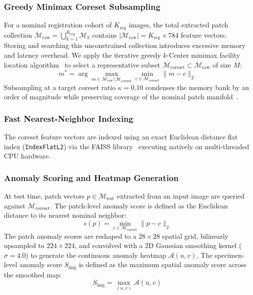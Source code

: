 \documentclass[journal]{IEEEtran}
\begin{document}
\subsubsection{Greedy Minimax Coreset Subsampling}
For a nominal registration cohort of $K_{\text{reg}}$ images, the total extracted patch collection $\mathcal{M}_{\text{raw}} = \bigcup_{k=1}^{K_{\text{reg}}} \mathcal{M}_k$ contains $|\mathcal{M}_{\text{raw}}| = K_{\text{reg}} \times 784$ feature vectors. Storing and searching this unconstrained collection introduces excessive memory and latency overhead. We apply the iterative greedy $k$-Center minimax facility location algorithm~\cite{roth2022towards} to select a representative subset $\mathcal{M}_{\text{coreset}} \subset \mathcal{M}_{\text{raw}}$ of size $M$:
\begin{equation}
m^* = \arg\max_{m \in \mathcal{M}_{\text{raw}} \setminus \mathcal{M}_{\text{coreset}}} \min_{c \in \mathcal{M}_{\text{coreset}}} \|m - c\|_2
\end{equation}
Subsampling at a target coreset ratio $\kappa = 0.10$ condenses the memory bank by an order of magnitude while preserving coverage of the nominal patch manifold~\cite{roth2022towards}.

\subsubsection{Fast Nearest-Neighbor Indexing}
The coreset feature vectors are indexed using an exact Euclidean distance flat index (\texttt{IndexFlatL2}) via the FAISS library~\cite{johnson2019billion} executing natively on multi-threaded CPU hardware.

\subsubsection{Anomaly Scoring and Heatmap Generation}
At test time, patch vectors $p \in \mathcal{M}_{\text{test}}$ extracted from an input image are queried against $\mathcal{M}_{\text{coreset}}$. The patch-level anomaly score is defined as the Euclidean distance to its nearest nominal neighbor:
\begin{equation}
s(p) = \min_{c \in \mathcal{M}_{\text{coreset}}} \|p - c\|_2
\end{equation}
The patch anomaly scores are reshaped to a $28 \times 28$ spatial grid, bilinearly upsampled to $224 \times 224$, and convolved with a 2D Gaussian smoothing kernel ($\sigma = 4.0$) to generate the continuous anomaly heatmap $\mathcal{A}(u,v)$. The specimen-level anomaly score $S_{\text{img}}$ is defined as the maximum spatial anomaly score across the smoothed map:
\begin{equation}
S_{\text{img}} = \max_{(u,v)} \mathcal{A}(u,v)
\end{equation}
\end{document}
